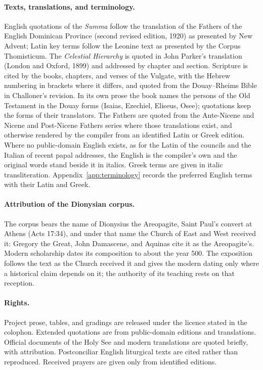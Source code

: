 \paragraph{Texts, translations, and terminology.} English quotations of the
\emph{Summa} follow the translation of the Fathers of the English Dominican
Province (second revised edition, 1920) as presented by New Advent; Latin key
terms follow the Leonine text as presented by the Corpus Thomisticum. The
\emph{Celestial Hierarchy} is quoted in John Parker's translation (London
and Oxford, 1899) and addressed by chapter and section. Scripture is cited
by the books, chapters, and verses of the Vulgate, with the Hebrew
numbering in brackets where it differs, and quoted from the Douay--Rheims
Bible in Challoner's revision. In its own prose the book names the persons of the Old
Testament in the Douay forms (Isaias, Ezechiel, Eliseus, Osee); quotations
keep the forms of their translators. The Fathers are quoted from the Ante-Nicene
and Nicene and Post-Nicene Fathers series where those translations exist,
and otherwise rendered by the compiler from an identified Latin or Greek
edition. Where
no public-domain English exists, as for the Latin of the councils and the
Italian of recent papal addresses, the English is the compiler's own and
the original words stand beside it in italics. Greek terms are given in
italic transliteration. Appendix~\ref{app:terminology} records the preferred
English terms with their Latin and Greek.

\paragraph{Attribution of the Dionysian corpus.} The corpus bears the name
of Dionysius the Areopagite, Saint Paul's convert at Athens (Acts 17:34), and
under that name the Church of East and West received it: Gregory the Great,
John Damascene, and Aquinas cite it as the Areopagite's. Modern scholarship
dates its composition to about the year 500. The exposition follows the text
as the Church received it and gives the modern dating only where a
historical claim depends on it; the authority of its teaching rests on that
reception.

\paragraph{Rights.} Project prose, tables, and gradings are released under
the licence stated in the colophon. Extended quotations are from
public-domain editions and translations. Official documents of the Holy See
and modern translations are quoted briefly, with attribution. Postconciliar
English liturgical texts are cited rather than reproduced. Received prayers
are given only from identified editions.

